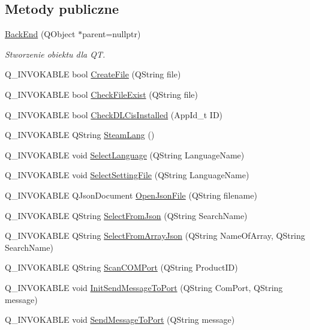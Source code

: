 \subsection*{Metody publiczne}
\begin{DoxyCompactItemize}
\item 
\hyperlink{class_back_end_space_1_1_back_end_ab6fe52b22e676d3809bcea4f94960a91}{Back\+End} (Q\+Object $\ast$parent=nullptr)
\begin{DoxyCompactList}\small\item\em Stworzenie obiektu dla QT. \end{DoxyCompactList}\item 
Q\+\_\+\+I\+N\+V\+O\+K\+A\+B\+LE bool \hyperlink{class_back_end_space_1_1_back_end_a04f69b715de1c65b21873a46b70fcc27}{Create\+File} (Q\+String file)
\item 
Q\+\_\+\+I\+N\+V\+O\+K\+A\+B\+LE bool \hyperlink{class_back_end_space_1_1_back_end_ab7c89f258fb3afaa6b2ef9d16b009560}{Check\+File\+Exist} (Q\+String file)
\item 
Q\+\_\+\+I\+N\+V\+O\+K\+A\+B\+LE bool \hyperlink{class_back_end_space_1_1_back_end_a8008a4eb621a34d14f6ab9612c9e7e41}{Check\+D\+L\+Cis\+Installed} (App\+Id\+\_\+t ID)
\item 
Q\+\_\+\+I\+N\+V\+O\+K\+A\+B\+LE Q\+String \hyperlink{class_back_end_space_1_1_back_end_a9e8a3b46de916f38288dbcdcb4ae8c85}{Steam\+Lang} ()
\item 
Q\+\_\+\+I\+N\+V\+O\+K\+A\+B\+LE void \hyperlink{class_back_end_space_1_1_back_end_a3a85c4416c934c36b89aed4e371c82a8}{Select\+Language} (Q\+String Language\+Name)
\item 
Q\+\_\+\+I\+N\+V\+O\+K\+A\+B\+LE void \hyperlink{class_back_end_space_1_1_back_end_a1c2234acf04382bdaf5adf2921a0ae65}{Select\+Setting\+File} (Q\+String Language\+Name)
\item 
Q\+\_\+\+I\+N\+V\+O\+K\+A\+B\+LE Q\+Json\+Document \hyperlink{class_back_end_space_1_1_back_end_ad74f93f446a7bea2878efabf9246cda4}{Open\+Json\+File} (Q\+String filename)
\item 
Q\+\_\+\+I\+N\+V\+O\+K\+A\+B\+LE Q\+String \hyperlink{class_back_end_space_1_1_back_end_a6d55511e3ef074926f1729631fb7f047}{Select\+From\+Json} (Q\+String Search\+Name)
\item 
Q\+\_\+\+I\+N\+V\+O\+K\+A\+B\+LE Q\+String \hyperlink{class_back_end_space_1_1_back_end_ad0ad4e5408150784a6a0195776474c56}{Select\+From\+Array\+Json} (Q\+String Name\+Of\+Array, Q\+String Search\+Name)
\item 
Q\+\_\+\+I\+N\+V\+O\+K\+A\+B\+LE Q\+String \hyperlink{class_back_end_space_1_1_back_end_a6f9b97532b4b944b460093cf2376778b}{Scan\+C\+O\+M\+Port} (Q\+String Product\+ID)
\item 
Q\+\_\+\+I\+N\+V\+O\+K\+A\+B\+LE void \hyperlink{class_back_end_space_1_1_back_end_a1eb19f81437255ea4bf5cc1651f1047c}{Init\+Send\+Message\+To\+Port} (Q\+String Com\+Port, Q\+String message)
\item 
Q\+\_\+\+I\+N\+V\+O\+K\+A\+B\+LE void \hyperlink{class_back_end_space_1_1_back_end_a99031e7e8e436c26cc8c49ea73084f1b}{Send\+Message\+To\+Port} (Q\+String message)
\end{DoxyCompactItemize}


